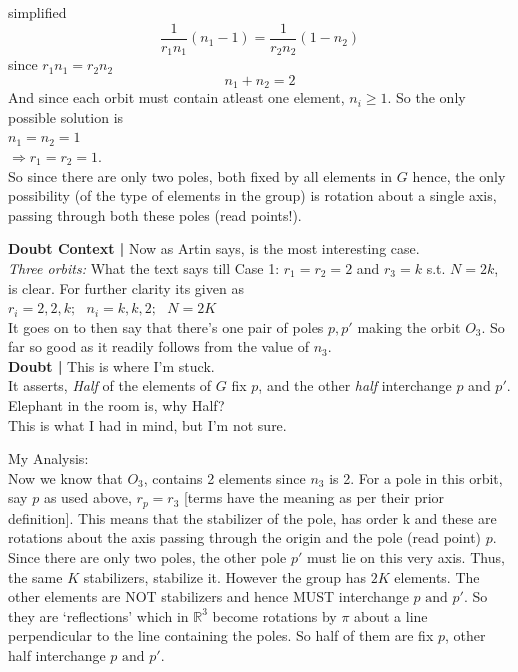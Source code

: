 \documentclass[12pt]{article}
\begin{document}
simplified
\begin{equation}
\frac{1}{r_{1}n_{1}}(n_{1} - 1) = \frac{1}{r_{2}n_{2}}(1- n_{2})
\end{equation}
since ${r_{1}n_{1} = r_{2}n_{2}}$
\begin{equation}
n_{1} + n_{2} = 2
\end{equation}
And since each orbit must contain atleast one element, $n_{i} \geq 1$. So the only possible solution is\\
$n_{1}=n_{2}=1$\\
$\Rightarrow r_{1}=r_{2}=1$.\\
So since there are only two poles, both fixed by all elements in $G$ hence, the only possibility (of the type of elements in the group) is rotation about a single axis, passing through both these poles (read points!).
\par
{\bf Doubt Context | }
Now as Artin says, is the most interesting case.\\
\emph{Three orbits: } What the text says till Case 1: $r_{1}=r_{2}=2$ and $r_{3}=k$ s.t. $N=2k$, is clear. For further clarity its given as\\
$r_{i}=2,2,k; \,\,\,\, n_{i}=k,k,2; \,\,\,\, N=2K$\\
It goes on to then say that there's one pair of poles ${p,p'}$ making the orbit $O_{3}$. So far so good as it readily follows from the value of $n_{3}$.\\ {\bf Doubt |} This is where I'm stuck.\\
It asserts, \emph{Half} of the elements of $G$ fix $p$, and the other \emph{half} interchange $p$ and $p'$.\\
Elephant in the room is, why Half?\\
This is what I had in mind, but I'm not sure.
\par
My Analysis:\\
Now we know that $O_{3}$, contains 2 elements since $n_{3}$ is 2. For a pole in this orbit, say $p$ as used above, $r_{p}=r_{3}$ [terms have the meaning as per their prior definition]. This means that the stabilizer of the pole, has order k and these are rotations about the axis passing through the origin and the pole (read point) $p$. Since there are only two poles, the other pole $p'$ must lie on this very axis. Thus, the same $K$ stabilizers, stabilize it. However the group has $2K$ elements. The other elements are NOT stabilizers and hence MUST interchange $p \text{ and } p'$. So they are `reflections' which in $\mathbb R^{3}$ become rotations by $\pi$ about a line perpendicular to the line containing the poles. So half of them are fix $p$, other half interchange $p \text{ and } p'$.
\end{document}
